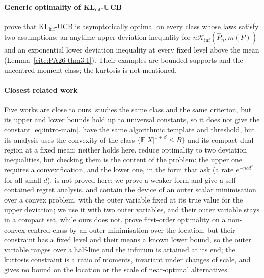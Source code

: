 \documentclass[11pt]{article}
\newcommand{\E}{\mathbb{E}}
\begin{document}
\paragraph{Generic optimality of KL$_{\inf}$-UCB} \citet{PA26} prove that KL$_{\inf}$-UCB is
asymptotically optimal on every class whose laws satisfy two assumptions: an anytime upper deviation
inequality for $n\mathcal{K}_{\inf}(\hat P_n,m(P))$ and an exponential lower deviation inequality at every fixed
level above the mean (Lemma~\ref{cite:PA26-thm3.1}). Their examples are bounded supports and the
uncentred moment class; the kurtosis is not mentioned.

\paragraph{Closest related work} Five works are close to ours. \citet{L17} studies the same class and the
same criterion, but its upper and lower bounds hold up to universal constants, so it does not give the
constant \eqref{eq:intro-main}. \citet{AJK21} have the same algorithmic template and threshold, but its
analysis uses the convexity of the class $\{\E|X|^{1+\beta}\le B\}$ and its compact dual region at a fixed
mean; neither holds here. \citet{PA26} reduce optimality to two deviation inequalities, but checking them
is the content of the problem: the upper one requires a convexification, and the lower one, in the form
that \citet{PA26} ask (a rate $e^{-ncd^2}$ for all small $d$), is not proved here; we prove a weaker form
and give a self-contained regret analysis. \citet{AKJ21} and \citet{A22} contain the device of an outer scalar
minimisation over a convex problem, with the outer variable fixed at its true value for the upper
deviation; we use it with two outer variables, and their outer variable stays in a compact set, while
ours does not. \citet{BSH23} prove first-order optimality on a non-convex centred class by an outer
minimisation over the location, but their constraint has a fixed level and their means a known lower bound,
so the outer variable ranges over a half-line and the infimum is attained at its end; the kurtosis constraint
is a ratio of moments, invariant under changes of scale, and gives no bound on the location or the scale of
near-optimal alternatives.
\end{document}
